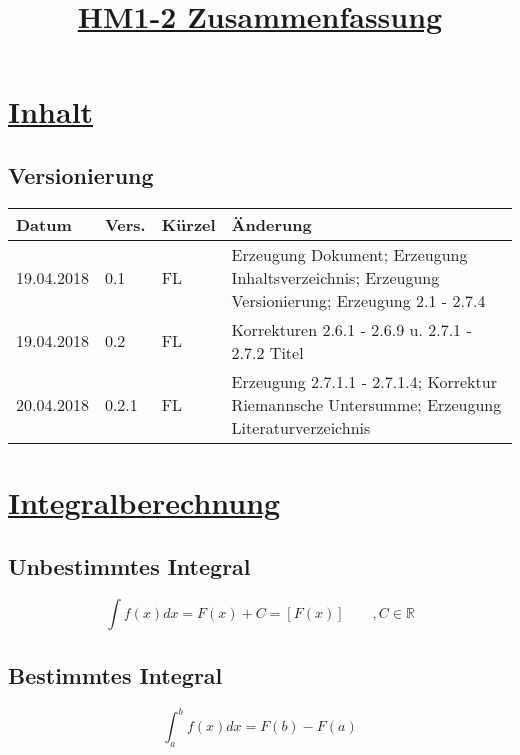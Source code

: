 \documentclass[12pt,a4paper]{article}%
\numberwithin{equation}{section}
\newcommand{\R}{\mathbb{R}} %
\begin{document}


\author{}
\title{\underline{HM1-2 Zusammenfassung}}
\date{}

\maketitle %
\newpage
\section{\underline{Inhalt}}
\tableofcontents

\subsection{Versionierung}
\begin{tabular}{|p{2cm}|p{1cm}|p{1.5cm}|p{8.5cm}|}\hline
Datum & Vers. & Kürzel & Änderung \\ \hline
19.04.2018 & 0.1 & FL & Erzeugung Dokument; Erzeugung Inhaltsverzeichnis; Erzeugung Versionierung;
Erzeugung 2.1 - 2.7.4 \\ \hline
19.04.2018 & 0.2 & FL & Korrekturen 2.6.1 - 2.6.9 u. 2.7.1 - 2.7.2 Titel\\ \hline
20.04.2018 & 0.2.1 & FL & Erzeugung 2.7.1.1 - 2.7.1.4; Korrektur Riemannsche Untersumme; Erzeugung Literaturverzeichnis \\ \hline
\end{tabular}

\newpage
 
\section{\underline{Integralberechnung}}
\subsection{Unbestimmtes Integral}
\begin{equation}
\int f(x) dx = F(x) + C = [F(x)]\qquad, C\in\R \label{eq:def_noBorder}
\end{equation}

\subsection{Bestimmtes Integral}
\begin{equation}
\int_a^b f(x) dx = F(b) - F(a) \label{eq:def_border}
\end{equation}
\end{document}

